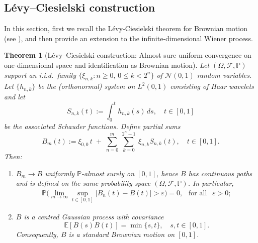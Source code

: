 \documentclass[english,a4paper,11pt]{amsart}
\theoremstyle{plain}
\newtheorem{theorem}{Theorem}[section]
\theoremstyle{definition}
\theoremstyle{remark}
\renewcommand{\emph}[1]{{\sl #1}}
\numberwithin{equation}{section}
\newcommand{\ep} {\varepsilon }
\newcommand{\PP}{{\mathbb{P}}}
\renewcommand{\P}{\mathbb{P}}
\renewcommand{\emph}[1]{{\sl #1}}
\begin{document}
\begin{appendix}
\section{L\'evy--Ciesielski construction}\label{LC:sec} In this section, first we recall the L\'evy-Ciesielski theorem for Brownian motion (see \cite[Theorem 6.1]{Rogers}), and then provide an extension to the infinite-dimensional Wiener process.
\begin{theorem}[Lévy--Ciesielski construction: Almost sure uniform convergence on one-dimensional space and identification as Brownian motion]
	Let $(\Omega,\mathcal F,\mathbb P)$ support an i.i.d.\ family $\{\xi_{n,k}: n\ge 0, \, {0\le k<2^n}\}$ of $\mathcal N(0,1)$ random variables.
	Let $\{h_{n,k}\}$ be the (orthonormal) system  on $L^2(0,1)$  consisting of Haar wavelets and let
	\[
	S_{n,k}(t):=\int_0^t h_{n,k}(s)\,ds, \quad t\in[0,1]
	\]
	be the associated Schauder functions. Define partial sums
	\[
	B_m(t):=\xi_{0,0}\,t\;+\;\sum_{n=0}^{m}\ \sum_{k=0}^{2^n-1}\ \xi_{n,k} S_{n,k}(t),\quad t\in[0,1].
	\]
	Then:
	\begin{enumerate}
		\item $B_m\to B$ \emph{uniformly $\PP$-almost surely} on $[0,1]$, hence $B$ has continuous paths and is defined on the same probability space $(\Omega,\mathcal F,\mathbb P)$.
		In particular, 
		\begin{align*}
			\P \Big(\lim_{m\to\infty}\sup_{t\in[0,1]}\big|B_n(t)-B(t)\big|>\ep\Big)=0, \ \ \text{ for all }\ \ \ep>0;
		\end{align*}

		
		\item $B$ is a centred Gaussian process with covariance
		\[
		\mathbb E[B(s)B(t)]=\min\{s,t\},\quad s,t\in[0,1].
		\]
		Consequently, $B$ is a standard Brownian motion on $[0,1]$.
	\end{enumerate}
\end{theorem}


\end{appendix}
\end{document}
